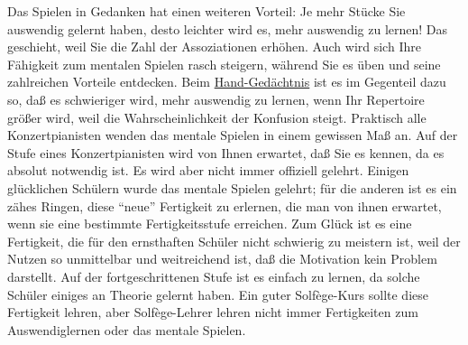Das Spielen in Gedanken hat einen weiteren Vorteil: Je mehr Stücke Sie auswendig gelernt haben, desto leichter wird es, mehr auswendig zu lernen!
Das geschieht, weil Sie die Zahl der Assoziationen erhöhen.
Auch wird sich Ihre Fähigkeit zum mentalen Spielen rasch steigern, während Sie es üben und seine zahlreichen Vorteile entdecken.
Beim \hyperref[c1iii6d]{Hand-Gedächtnis} ist es im Gegenteil dazu so, daß es schwieriger wird, mehr auswendig zu lernen, wenn Ihr Repertoire größer wird, weil die Wahrscheinlichkeit der Konfusion steigt.
Praktisch alle Konzertpianisten wenden das mentale Spielen in einem gewissen Maß an.
Auf der Stufe eines Konzertpianisten wird von Ihnen erwartet, daß Sie es kennen, da es absolut notwendig ist.
Es wird aber nicht immer offiziell gelehrt.
Einigen glücklichen Schülern wurde das mentale Spielen gelehrt; für die anderen ist es ein zähes Ringen, diese \enquote{neue} Fertigkeit zu erlernen, die man von ihnen erwartet, wenn sie eine bestimmte Fertigkeitsstufe erreichen.
Zum Glück ist es eine Fertigkeit, die für den ernsthaften Schüler nicht schwierig zu meistern ist, weil der Nutzen so 
unmittelbar und weitreichend ist, daß die Motivation kein Problem darstellt.
Auf der fortgeschrittenen Stufe ist es einfach zu lernen, da solche Schüler einiges an Theorie gelernt haben.
Ein guter Solfège-Kurs sollte diese Fertigkeit lehren, aber Solfège-Lehrer lehren nicht immer Fertigkeiten zum Auswendiglernen oder das mentale Spielen.

